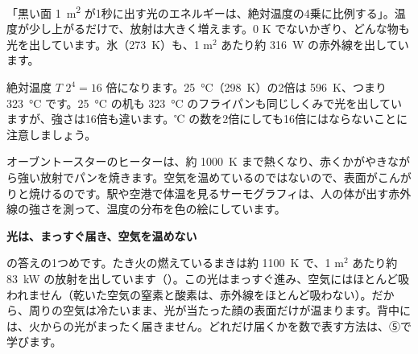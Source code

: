 \begin{phyomi}[$E_{\mathrm b}=\sigma T^4$]
「黒い面 \qty{1}{m^2} が1秒に出す光のエネルギーは、絶対温度の4乗に比例する」。温度が少し上がるだけで、放射は大きく増えます。0 K でないかぎり、どんな物も光を出しています。氷（\qty{273}{K}）も、1 m$^2$ あたり約 \qty{316}{W} の赤外線を出しています。
\end{phyomi}
\begin{phbaisuru}{絶対温度 $T$}
$2^4=16$ 倍になります。\qty{25}{\celsius}（\qty{298}{K}）の2倍は \qty{596}{K}、つまり \qty{323}{\celsius} です。\qty{25}{\celsius} の机も \qty{323}{\celsius} のフライパンも同じしくみで光を出していますが、強さは16倍も違います。℃ の数を2倍にしても16倍にはならないことに注意しましょう。
\par\vspace{2pt}\centering
{}
\end{phbaisuru}
\begin{phmijika}
オーブントースターのヒーターは、約 \qty{1000}{K} まで熱くなり、赤くかがやきながら強い放射でパンを焼きます。空気を温めているのではないので、表面がこんがりと焼けるのです。駅や空港で体温を見るサーモグラフィは、人の体が出す赤外線の強さを測って、温度の分布を色の絵にしています。
\end{phmijika}

\noindent\textbf{光は、まっすぐ届き、空気を温めない}\par\nobreak
\label{ph:熱-13:hatena1}\bkhatenaref の答えの1つめです。たき火の燃えているまきは約 \qty{1100}{K} で、1 m$^2$ あたり約 \qty{83}{kW} の放射を出しています（\nobreak{}\nobreak）。この光はまっすぐ進み、空気にはほとんど吸われません（乾いた空気の窒素と酸素は、赤外線をほとんど吸わない）。だから、周りの空気は冷たいまま、光が当たった顔の表面だけが温まります。背中には、火からの光がまったく届きません。どれだけ届くかを数で表す方法は、⑤で学びます。

